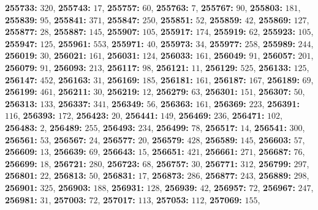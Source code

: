 \textsf{\bfseries 255733:} $320$, \textsf{\bfseries 255743:} $17$, \textsf{\bfseries 255757:} $60$, \textsf{\bfseries 255763:} $7$, \textsf{\bfseries 255767:} $90$, \textsf{\bfseries 255803:} $181$, \textsf{\bfseries 255839:} $95$, \textsf{\bfseries 255841:} $371$, \textsf{\bfseries 255847:} $250$, \textsf{\bfseries 255851:} $52$, \textsf{\bfseries 255859:} $42$, \textsf{\bfseries 255869:} $127$, \textsf{\bfseries 255877:} $28$, \textsf{\bfseries 255887:} $145$, \textsf{\bfseries 255907:} $105$, \textsf{\bfseries 255917:} $174$, \textsf{\bfseries 255919:} $62$, \textsf{\bfseries 255923:} $105$, \textsf{\bfseries 255947:} $125$, \textsf{\bfseries 255961:} $553$, \textsf{\bfseries 255971:} $40$, \textsf{\bfseries 255973:} $34$, \textsf{\bfseries 255977:} $258$, \textsf{\bfseries 255989:} $244$, \textsf{\bfseries 256019:} $30$, \textsf{\bfseries 256021:} $161$, \textsf{\bfseries 256031:} $124$, \textsf{\bfseries 256033:} $161$, \textsf{\bfseries 256049:} $91$, \textsf{\bfseries 256057:} $201$, \textsf{\bfseries 256079:} $91$, \textsf{\bfseries 256093:} $213$, \textsf{\bfseries 256117:} $98$, \textsf{\bfseries 256121:} $11$, \textsf{\bfseries 256129:} $525$, \textsf{\bfseries 256133:} $125$, \textsf{\bfseries 256147:} $452$, \textsf{\bfseries 256163:} $31$, \textsf{\bfseries 256169:} $185$, \textsf{\bfseries 256181:} $161$, \textsf{\bfseries 256187:} $167$, \textsf{\bfseries 256189:} $69$, \textsf{\bfseries 256199:} $461$, \textsf{\bfseries 256211:} $30$, \textsf{\bfseries 256219:} $12$, \textsf{\bfseries 256279:} $63$, \textsf{\bfseries 256301:} $151$, \textsf{\bfseries 256307:} $50$, \textsf{\bfseries 256313:} $133$, \textsf{\bfseries 256337:} $341$, \textsf{\bfseries 256349:} $56$, \textsf{\bfseries 256363:} $161$, \textsf{\bfseries 256369:} $223$, \textsf{\bfseries 256391:} $116$, \textsf{\bfseries 256393:} $172$, \textsf{\bfseries 256423:} $20$, \textsf{\bfseries 256441:} $149$, \textsf{\bfseries 256469:} $236$, \textsf{\bfseries 256471:} $102$, \textsf{\bfseries 256483:} $2$, \textsf{\bfseries 256489:} $255$, \textsf{\bfseries 256493:} $234$, \textsf{\bfseries 256499:} $78$, \textsf{\bfseries 256517:} $14$, \textsf{\bfseries 256541:} $300$, \textsf{\bfseries 256561:} $53$, \textsf{\bfseries 256567:} $24$, \textsf{\bfseries 256577:} $20$, \textsf{\bfseries 256579:} $428$, \textsf{\bfseries 256589:} $145$, \textsf{\bfseries 256603:} $57$, \textsf{\bfseries 256609:} $13$, \textsf{\bfseries 256639:} $69$, \textsf{\bfseries 256643:} $15$, \textsf{\bfseries 256651:} $421$, \textsf{\bfseries 256661:} $271$, \textsf{\bfseries 256687:} $76$, \textsf{\bfseries 256699:} $18$, \textsf{\bfseries 256721:} $280$, \textsf{\bfseries 256723:} $68$, \textsf{\bfseries 256757:} $30$, \textsf{\bfseries 256771:} $312$, \textsf{\bfseries 256799:} $297$, \textsf{\bfseries 256801:} $22$, \textsf{\bfseries 256813:} $50$, \textsf{\bfseries 256831:} $17$, \textsf{\bfseries 256873:} $286$, \textsf{\bfseries 256877:} $243$, \textsf{\bfseries 256889:} $298$, \textsf{\bfseries 256901:} $325$, \textsf{\bfseries 256903:} $188$, \textsf{\bfseries 256931:} $128$, \textsf{\bfseries 256939:} $42$, \textsf{\bfseries 256957:} $72$, \textsf{\bfseries 256967:} $247$, \textsf{\bfseries 256981:} $31$, \textsf{\bfseries 257003:} $72$, \textsf{\bfseries 257017:} $113$, \textsf{\bfseries 257053:} $112$, \textsf{\bfseries 257069:} $155$, 
